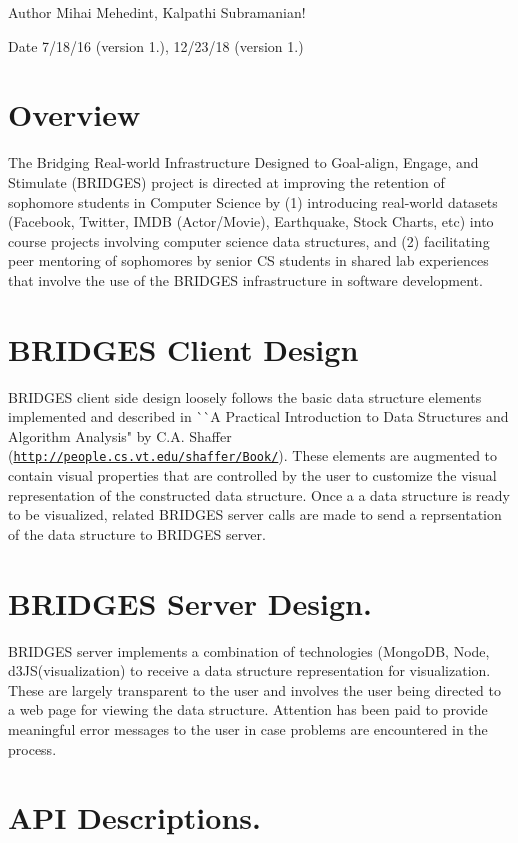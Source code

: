 \begin{DoxyAuthor}{Author}
Mihai Mehedint, Kalpathi Subramanian! 
\end{DoxyAuthor}
\begin{DoxyDate}{Date}
7/18/16 (version 1.), 12/23/18 (version 1.)
\end{DoxyDate}
\hypertarget{index_overview_sec}{}\section{Overview}\label{index_overview_sec}
The Bridging Real-\/world Infrastructure Designed to Goal-\/align, Engage, and Stimulate (B\+R\+I\+D\+G\+ES) project is directed at improving the retention of sophomore students in Computer Science by (1) introducing real-\/world datasets (Facebook, Twitter, I\+M\+DB (Actor/\+Movie), Earthquake, Stock Charts, etc) into course projects involving computer science data structures, and (2) facilitating peer mentoring of sophomores by senior CS students in shared lab experiences that involve the use of the B\+R\+I\+D\+G\+ES infrastructure in software development. \hypertarget{index_br_client}{}\section{B\+R\+I\+D\+G\+E\+S Client Design}\label{index_br_client}
B\+R\+I\+D\+G\+ES client side design loosely follows the basic data structure elements implemented and described in \`{}\`{}A Practical Introduction to Data Structures and Algorithm Analysis" by C.\+A. Shaffer (\href{http://people.cs.vt.edu/shaffer/Book/}{\tt http\+://people.\+cs.\+vt.\+edu/shaffer/\+Book/}). These elements are augmented to contain visual properties that are controlled by the user to customize the visual representation of the constructed data structure. Once a a data structure is ready to be visualized, related B\+R\+I\+D\+G\+ES server calls are made to send a reprsentation of the data structure to B\+R\+I\+D\+G\+ES server. \hypertarget{index_br_server}{}\section{B\+R\+I\+D\+G\+E\+S Server Design.}\label{index_br_server}
B\+R\+I\+D\+G\+ES server implements a combination of technologies (Mongo\+DB, Node, d3\+J\+S(visualization) to receive a data structure representation for visualization. These are largely transparent to the user and involves the user being directed to a web page for viewing the data structure. Attention has been paid to provide meaningful error messages to the user in case problems are encountered in the process. \hypertarget{index_api_sec}{}\section{A\+P\+I Descriptions.}\label{index_api_sec}
